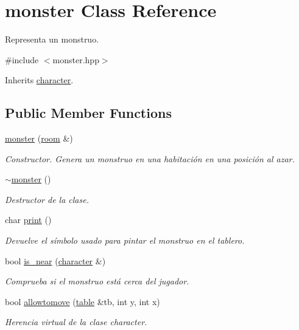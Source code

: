 \hypertarget{classmonster}{\section{monster Class Reference}
\label{classmonster}
}


Representa un monstruo.  




{\ttfamily \#include $<$monster.\-hpp$>$}



Inherits \hyperlink{classcharacter}{character}.

\subsection*{Public Member Functions}
\begin{DoxyCompactItemize}
\item 
\hyperlink{classmonster_aad4487ad08dc8389e6d27a1dae549b55}{monster} (\hyperlink{classroom}{room} \&)
\begin{DoxyCompactList}\small\item\em Constructor. Genera un monstruo en una habitación en una posición al azar. \end{DoxyCompactList}\item 
\hypertarget{classmonster_a4b4482b9318c7a07951b1224078699d0}{\hyperlink{classmonster_a4b4482b9318c7a07951b1224078699d0}{$\sim$monster} ()}\label{classmonster_a4b4482b9318c7a07951b1224078699d0}

\begin{DoxyCompactList}\small\item\em Destructor de la clase. \end{DoxyCompactList}\item 
char \hyperlink{classmonster_a6941903e9c2252cb1bf0ff2fc3378fa8}{print} ()
\begin{DoxyCompactList}\small\item\em Devuelve el símbolo usado para pintar el monstruo en el tablero. \end{DoxyCompactList}\item 
bool \hyperlink{classmonster_a6865ea3fa0daa2dc6ce831bcdc505d5a}{is\-\_\-near} (\hyperlink{classcharacter}{character} \&)
\begin{DoxyCompactList}\small\item\em Comprueba si el monstruo está cerca del jugador. \end{DoxyCompactList}\item 
bool \hyperlink{classmonster_ac86a063c732cddc17e870926e933943e}{allowtomove} (\hyperlink{classtable}{table} \&tb, int y, int x)
\begin{DoxyCompactList}\small\item\em Herencia virtual de la clase character. \end{DoxyCompactList}\end{DoxyCompactItemize}
